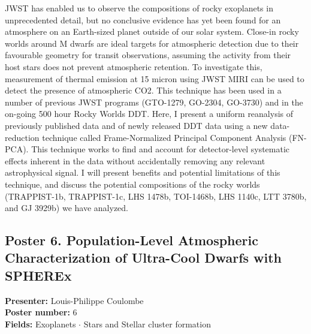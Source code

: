 JWST has enabled us to observe the compositions of rocky exoplanets in unprecedented detail, but no conclusive evidence has yet been found for an atmosphere on an Earth-sized planet outside of our solar system. Close-in rocky worlds around M dwarfs are ideal targets for atmospheric detection due to their favourable geometry for transit observations, assuming the activity from their host stars does not prevent atmospheric retention. To investigate this, measurement of thermal emission at 15 micron using JWST MIRI can be used to detect the presence of atmospheric CO2. This technique has been used in a number of previous JWST programs (GTO-1279, GO-2304, GO-3730) and in the on-going 500 hour Rocky Worlds DDT. Here, I present a uniform reanalysis of previously published data and of newly released DDT data using a new data-reduction technique called Frame-Normalized Principal Component Analysis (FN-PCA). This technique works to find and account for detector-level systematic effects inherent in the data without accidentally removing any relevant astrophysical signal. I will present benefits and potential limitations of this technique, and discuss the potential compositions of the rocky worlds (TRAPPIST-1b, TRAPPIST-1c, LHS 1478b, TOI-1468b, LHS 1140c, LTT 3780b, and GJ 3929b) we have analyzed.

\hypertarget{poster-abstract-talk-56}{}\label{poster-abstract-page-talk-56}
\subsection*{Poster 6. Population-Level Atmospheric Characterization of Ultra-Cool Dwarfs with SPHEREx}
\textbf{Presenter:} Louis-Philippe Coulombe\\
\textbf{Poster number:} 6\\
\textbf{Fields:} Exoplanets $\cdot$ Stars and Stellar cluster formation

